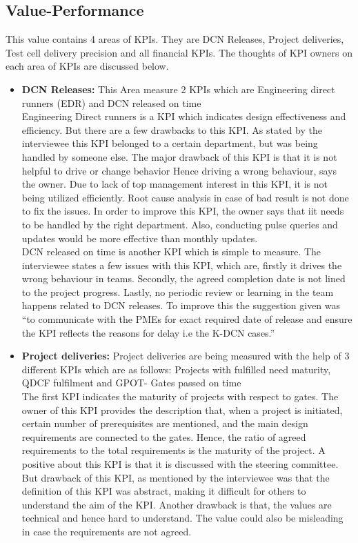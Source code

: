 \subsection{Value-Performance}
This value contains 4 areas of KPIs. They are DCN Releases, Project deliveries, Test cell delivery precision and all financial KPIs.
The thoughts of KPI owners on each area of KPIs are discussed below.

\begin{itemize}
    
     \item \textbf{DCN Releases:} This Area measure 2 KPIs which are Engineering direct runners (EDR) and DCN released on time
\\

Engineering Direct runners is a KPI which indicates design effectiveness and efficiency. But there are a few drawbacks to this KPI. As stated by the interviewee this KPI belonged to a certain department, but was being handled by someone else. The major drawback of this KPI is that it is not helpful to drive or change behavior Hence driving a wrong behaviour, says the owner. Due to lack of top management interest in this KPI, it is not being utilized efficiently. Root cause analysis in case of bad result is not done to fix the issues.
In order to improve this KPI, the owner says that iit needs to be handled by the right department. Also, conducting pulse queries and updates would be more effective than monthly updates.\\

DCN released on time is another KPI which is simple to measure. The interviewee states a few issues with this KPI, which are, firstly it drives the wrong behaviour in teams. Secondly, the agreed completion date is not lined to the project progress. Lastly, no periodic review or learning in the team happens related to DCN releases.
To improve this the suggestion given was “to communicate with the PMEs for exact required date of release and ensure the KPI reflects the reasons for delay i.e the K-DCN cases.”\\


\item \textbf{Project deliveries:} Project deliveries are being measured with the help of 3 different KPIs which are as follows:
Projects with fulfilled need maturity, QDCF fulfilment and
GPOT- Gates passed on time
\\

The first KPI indicates the maturity of projects with respect to gates. The owner of this KPI provides the description that, when a project is initiated, certain number of prerequisites are mentioned, and the main design requirements are connected to the gates. Hence, the ratio of agreed requirements to the total requirements is the maturity of the project. A positive about this KPI is that it is discussed with the steering committee. But drawback of this KPI, as mentioned by the interviewee was that the definition of this KPI was abstract, making it difficult for others to understand the aim of the KPI. Another drawback is that, the values are technical and hence hard to understand. The value could also be misleading in case the requirements are not agreed.\\


\end{itemize}
